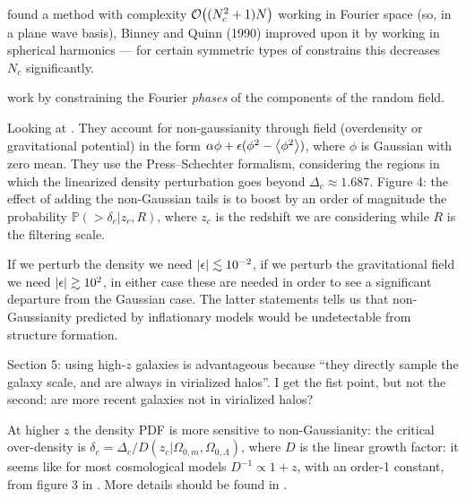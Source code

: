 \documentclass[main.tex]{subfiles}
\begin{document}
\textcite[]{bertschingerPathIntegralMethods1987} found a method with complexity \(\order{(N_c^2 + 1) N}\) working in Fourier space (so, in a plane wave basis), 
Binney and Quinn (1990) improved upon it by working in spherical harmonics --- 
for certain symmetric types of constrains this decreases \(N_c\) significantly. 

\textcite[]{hoffmanConstrainedRealizationsGaussian1991} work by constraining the Fourier \emph{phases} of the components of the random field. 


Looking at \cite[]{matarreseAbundanceHighRedshift2000}. 
They account for non-gaussianity through field (overdensity or gravitational potential) in the form \(\alpha \phi + \epsilon (\phi^2 - \expval{\phi^2 }) \), where \(\phi \) is Gaussian with zero mean. 
They use the Press–Schechter formalism, considering the regions in which the linearized density perturbation  goes beyond \(\Delta  _c \approx 1.687\).
Figure 4: the effect of adding the non-Gaussian tails is to boost by an order of magnitude the probability \(\mathbb{P}(> \delta _c | z_c, R)\), where \(z_c\) is the redshift we are considering while \(R\) is the filtering scale. 

If we perturb the density we need \(\abs{\epsilon} \lesssim \num{e-2}\), if we perturb the gravitational field we need \(\abs{\epsilon } \gtrsim \num{e2}\), in either case these are needed in order to see a significant departure from the Gaussian case. 
The latter statements tells us that non-Gaussianity predicted by inflationary models would be undetectable from structure formation. 


Section 5: using high-\(z\) galaxies is advantageous because ``they directly sample the galaxy scale, and are always in virialized halos''. I get the fist point, but not the second: are more recent galaxies not in virialized halos? 

At higher \(z\) the density PDF is more sensitive to non-Gaussianity: the critical over-density is \(\delta _c = \Delta _c / D(z_c  | \Omega_{0, m}, \Omega_{0, \Lambda })\), where \(D\) is the linear growth factor: it seems like for most cosmological models \(D^{-1} \propto 1+z\), with an order-1 constant, from figure 3 in \cite[]{matarreseAbundanceHighRedshift2000}. 
More details should be found in \cite[]{hamiltonFormulaeGrowthFactors2001}. 
\end{document}

